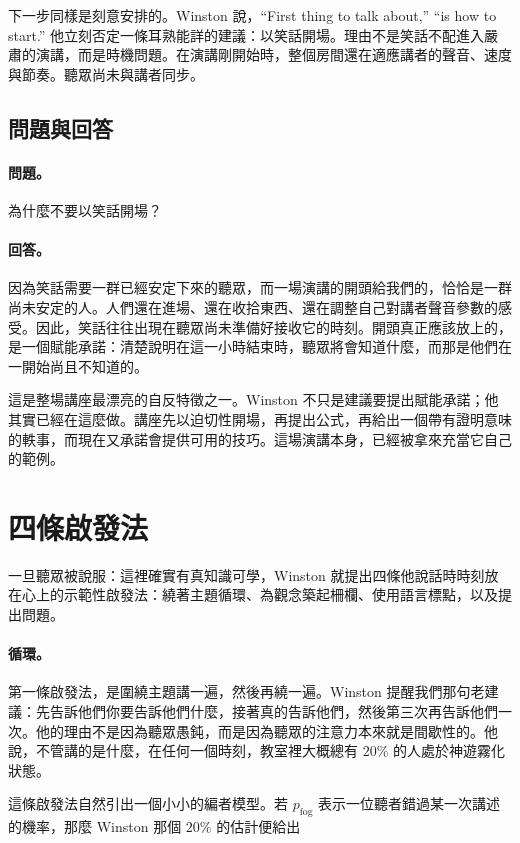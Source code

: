 下一步同樣是刻意安排的。Winston 說，``First thing to talk about,'' ``is how to start.'' 他立刻否定一條耳熟能詳的建議：以笑話開場。理由不是笑話不配進入嚴肅的演講，而是時機問題。在演講剛開始時，整個房間還在適應講者的聲音、速度與節奏。聽眾尚未與講者同步。

\subsection{問題與回答}

\paragraph{問題。} 為什麼不要以笑話開場？

\paragraph{回答。} 因為笑話需要一群已經安定下來的聽眾，而一場演講的開頭給我們的，恰恰是一群尚未安定的人。人們還在進場、還在收拾東西、還在調整自己對講者聲音參數的感受。因此，笑話往往出現在聽眾尚未準備好接收它的時刻。開頭真正應該放上的，是一個賦能承諾：清楚說明在這一小時結束時，聽眾將會知道什麼，而那是他們在一開始尚且不知道的。

這是整場講座最漂亮的自反特徵之一。Winston 不只是建議要提出賦能承諾；他其實已經在這麼做。講座先以迫切性開場，再提出公式，再給出一個帶有證明意味的軼事，而現在又承諾會提供可用的技巧。這場演講本身，已經被拿來充當它自己的範例。

\section{四條啟發法}

一旦聽眾被說服：這裡確實有真知識可學，Winston 就提出四條他說話時時刻放在心上的示範性啟發法：繞著主題循環、為觀念築起柵欄、使用語言標點，以及提出問題。

\paragraph{循環。} 第一條啟發法，是圍繞主題講一遍，然後再繞一遍。Winston 提醒我們那句老建議：先告訴他們你要告訴他們什麼，接著真的告訴他們，然後第三次再告訴他們一次。他的理由不是因為聽眾愚鈍，而是因為聽眾的注意力本來就是間歇性的。他說，不管講的是什麼，在任何一個時刻，教室裡大概總有 \(20\%\) 的人處於神遊霧化狀態。

這條啟發法自然引出一個小小的編者模型。若 \(p_{\mathrm{fog}}\) 表示一位聽者錯過某一次講述的機率，那麼 Winston 那個 \(20\%\) 的估計便給出

